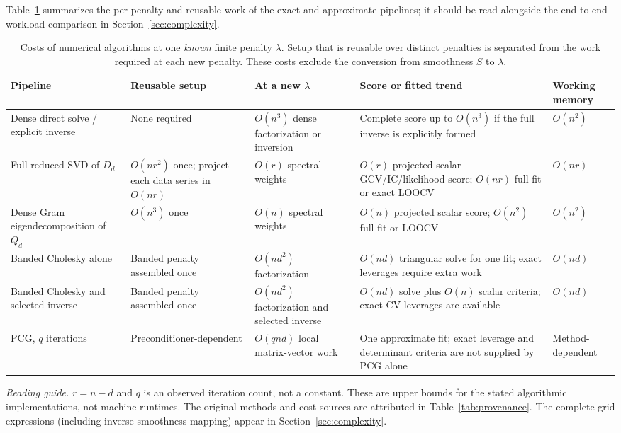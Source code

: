 Table~\ref{tab:algorithms} summarizes the per-penalty
and reusable work of the exact and approximate
pipelines; it should be read alongside the
end-to-end workload comparison in
Section~\ref{sec:complexity}.

\begin{table}
\centering
{\CSDAlocalcaptionstyle \caption{Costs of numerical algorithms at one \emph{known} finite
penalty $\lambda$. Setup that is reusable over distinct penalties
is separated from the work required at each new penalty. These
costs exclude the conversion from smoothness $S$ to $\lambda$.}\label{tab:algorithms}}
\setlength{\tabcolsep}{7pt}
\renewcommand{\arraystretch}{1.36}
\normalsize
\begin{tabularx}{0.95\textheight}{@{}p{0.195\textheight}p{0.155\textheight}p{0.19\textheight}X p{0.13\textheight}@{}}
\toprule
\textbf{Pipeline} &
\textbf{Reusable setup} &
\textbf{At a new $\lambda$} &
\textbf{Score or fitted trend} &
\textbf{Working memory}\\
\midrule
Dense direct solve / explicit inverse &
None required &
$O(n^3)$ dense factorization or inversion &
Complete score up to $O(n^3)$ if the full inverse is explicitly formed &
$O(n^2)$\\
\addlinespace
Full reduced SVD of $D_d$ &
$O(nr^2)$ once; project each data series in $O(nr)$ &
$O(r)$ spectral weights &
$O(r)$ projected scalar GCV/IC/likelihood score;
$O(nr)$ full fit or exact LOOCV &
$O(nr)$\\
\addlinespace
Dense Gram eigendecomposition of $Q_d$ &
$O(n^3)$ once &
$O(n)$ spectral weights &
$O(n)$ projected scalar score;
$O(n^2)$ full fit or LOOCV &
$O(n^2)$\\
\addlinespace
Banded Cholesky alone &
Banded penalty assembled once &
$O(nd^2)$ factorization &
$O(nd)$ triangular solve for one fit;
exact leverages require extra work &
$O(nd)$\\
\addlinespace
Banded Cholesky and selected inverse &
Banded penalty assembled once &
$O(nd^2)$ factorization and selected inverse &
$O(nd)$ solve plus $O(n)$ scalar criteria;
exact CV leverages are available &
$O(nd)$\\
\addlinespace
PCG, $q$ iterations &
Preconditioner-dependent &
$O(qnd)$ local matrix-vector work &
One approximate fit; exact leverage and
determinant criteria are not supplied by PCG alone &
Method-dependent\\
\bottomrule
\end{tabularx}

\vspace{8pt}
\begin{minipage}{0.95\textheight}
\small\emph{Reading guide.} $r=n-d$ and $q$ is an observed
iteration count, not a constant. These are upper bounds for
the stated algorithmic implementations, not machine runtimes.
The original methods and cost sources are attributed in
Table~\ref{tab:provenance}. The complete-grid expressions
(including inverse smoothness mapping) appear in
Section~\ref{sec:complexity}.
\end{minipage}
\end{table}
